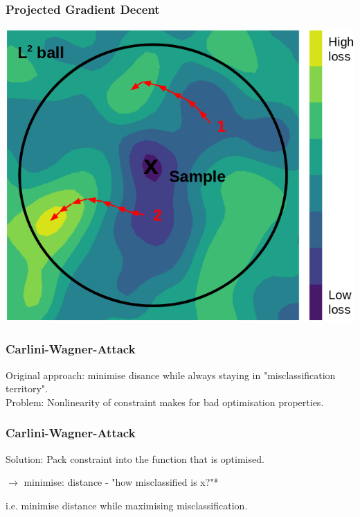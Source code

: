 \documentclass[10pt,usepdftitle=false,aspectratio=169]{beamer}
\begin{document}
\begin{frame}[fragile]
	\frametitle{Projected Gradient Decent}
	
	\begin{center}
		\includegraphics[height=0.75 	\textheight]{plots/pgd_pic.png}
	\end{center}

\end{frame}


\begin{frame}[fragile]
	\frametitle{Carlini-Wagner-Attack}
	
	\large Original approach: minimise disance while always staying in "misclassification territory". \\
	
	\medskip
	Problem: Nonlinearity of constraint makes for bad optimisation properties.
	
\end{frame}

\begin{frame}[fragile]
	\frametitle{Carlini-Wagner-Attack}
	
	\large Solution: Pack constraint into the function that is optimised.\\
	
	\bigskip
	
	$\rightarrow$ minimise: distance - "how misclassified is x?"*\\
	\smallskip
	
	i.e. minimise distance while maximising misclassification.
	
	
\end{frame}
\end{document}

